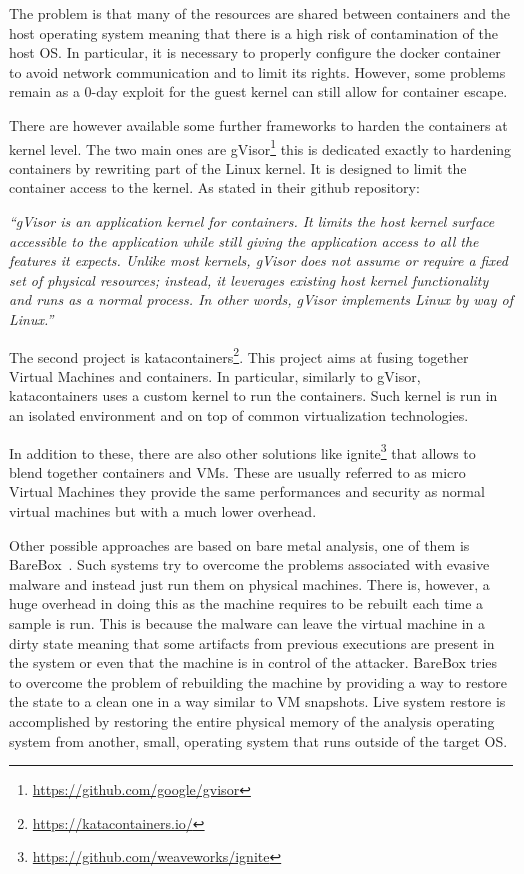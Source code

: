 The problem is that many of the resources are shared between containers and the host operating system meaning that there is a high risk of contamination of the host OS. In particular, it is necessary to properly configure the docker container to avoid network communication and to limit its rights. However, some problems remain as a 0-day exploit for the guest kernel can still allow for container escape. 

There are however available some further frameworks to harden the containers at kernel level. The two main ones are gVisor\footnote{\url{https://github.com/google/gvisor}} this is dedicated exactly to hardening containers by rewriting part of the Linux kernel. It is designed to limit the container access to the kernel. As stated in their github repository:

\textit{``gVisor is an application kernel for containers. It limits the host kernel surface accessible to the application while still giving the application access to all the features it expects. Unlike most kernels, gVisor does not assume or require a fixed set of physical resources; instead, it leverages existing host kernel functionality and runs as a normal process. In other words, gVisor implements Linux by way of Linux.''}

The second project is katacontainers\footnote{\url{https://katacontainers.io/}}. This project aims at fusing together Virtual Machines and containers. In particular, similarly to gVisor, katacontainers uses a custom kernel to run the containers. Such kernel is run in an isolated environment and on top of common virtualization technologies. 

In addition to these, there are also other solutions like ignite\footnote{\url{https://github.com/weaveworks/ignite}} that allows to blend together containers and VMs. These are usually referred to as micro Virtual Machines they provide the same performances and security as normal virtual machines but with a much lower overhead. 

Other possible approaches are based on bare metal analysis, one of them is BareBox~\cite{bbox}. Such systems try to overcome the problems associated with evasive malware and instead just run them on physical machines. There is, however, a huge overhead in doing this as the machine requires to be rebuilt each time a sample is run. This is because the malware can leave the virtual machine in a dirty state meaning that some artifacts from previous executions are present in the system or even that the machine is in control of the attacker. BareBox tries to overcome the problem of rebuilding the machine by providing a way to restore the state to a clean one in a way similar to VM snapshots. Live system restore is accomplished by restoring the entire physical memory of the analysis operating system from another, small, operating system that runs outside of the target OS. 

